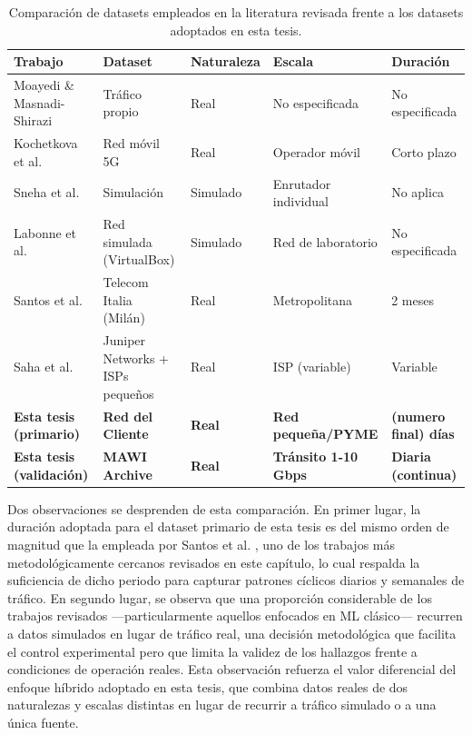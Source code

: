 \documentclass[12pt]{report}
\begin{document}
\begin{table}[H]
    \centering
    \small
    \begin{tabular}{|p{3.2cm}|p{2.6cm}|p{2cm}|p{2.2cm}|p{2.2cm}|}
        \hline
        \textbf{Trabajo} & \textbf{Dataset} & \textbf{Naturaleza} & \textbf{Escala} & \textbf{Duración} \\
        \hline
        Moayedi \& Masnadi-Shirazi \cite{moayedi2008} & Tráfico propio & Real & No especificada & No especificada \\
        \hline
        Kochetkova et al. \cite{kochetkova2023} & Red móvil 5G & Real & Operador móvil & Corto plazo \\
        \hline
        Sneha et al. \cite{sneha2020} & Simulación & Simulado & Enrutador individual & No aplica \\
        \hline
        Labonne et al. \cite{labonne2021} & Red simulada (VirtualBox) & Simulado & Red de laboratorio & No especificada \\
        \hline
        Santos et al. \cite{santos2022} & Telecom Italia (Milán) & Real & Metropolitana & 2 meses \\
        \hline
        Saha et al. \cite{saha2024} & Juniper Networks + ISPs pequeños & Real & ISP (variable) & Variable \\
        \hline
        \textbf{Esta tesis (primario)} & \textbf{Red del Cliente} & \textbf{Real} & \textbf{Red pequeña/PYME} & \textbf{(numero final) días} \\
        \hline
        \textbf{Esta tesis (validación)} & \textbf{MAWI Archive} \cite{mawi} & \textbf{Real} & \textbf{Tránsito 1-10 Gbps} & \textbf{Diaria (continua)} \\
        \hline
    \end{tabular}
    \caption{Comparación de datasets empleados en la literatura revisada frente a los datasets adoptados en esta tesis.}
    \label{tab:datasets_literatura}
\end{table}

Dos observaciones se desprenden de esta comparación. En primer lugar, la duración adoptada para el dataset primario de esta tesis es del mismo orden de magnitud que la empleada por Santos et al. \cite{santos2022}, uno de los trabajos más metodológicamente cercanos revisados en este capítulo, lo cual respalda la suficiencia de dicho periodo para capturar patrones cíclicos diarios y semanales de tráfico. En segundo lugar, se observa que una proporción 
considerable de los trabajos revisados —particularmente aquellos enfocados en ML clásico— recurren a datos simulados en lugar de tráfico real, una decisión metodológica que facilita el control experimental pero que limita la validez de los hallazgos frente a condiciones de operación reales. Esta observación refuerza el valor diferencial del enfoque híbrido adoptado en esta tesis, que combina datos reales de dos naturalezas y escalas distintas en lugar 
de recurrir a tráfico simulado o a una única fuente.
\newpage
\end{document}
